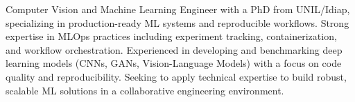 


\begin{cvparagraph}
Computer Vision and Machine Learning Engineer with a PhD from UNIL/Idiap, specializing in production-ready ML systems and reproducible workflows. Strong expertise in MLOps practices including experiment tracking, containerization, and workflow orchestration. Experienced in developing and benchmarking deep learning models (CNNs, GANs, Vision-Language Models) with a focus on code quality and reproducibility. Seeking to apply technical expertise to build robust, scalable ML solutions in a collaborative engineering environment.
\end{cvparagraph}
